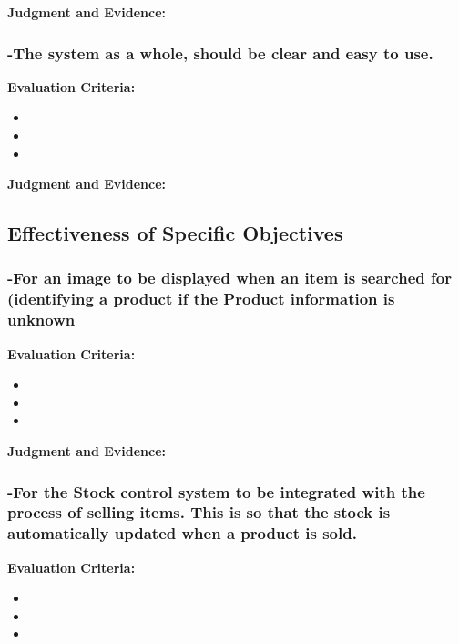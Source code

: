 \textbf{Judgment and Evidence:} \newline







\subsubsection{-The system as a whole, should be clear and easy to use.}
\textbf{Evaluation Criteria:} \newline
\begin{itemize}
\item{}
\item{}
\item{}
\end{itemize}

\textbf{Judgment and Evidence:} \newline









\subsection{Effectiveness of Specific Objectives}













\subsubsection{-For an image to be displayed when an item is searched for (identifying a product if the Product information is unknown}
\textbf{Evaluation Criteria:} \newline
\begin{itemize}
\item{}
\item{}
\item{}
\end{itemize}


\textbf{Judgment and Evidence:} \newline








\subsubsection{-For the Stock control system to be integrated with the process of selling items. This is so that the stock is automatically updated when a product is sold.}
\textbf{Evaluation Criteria:} \newline
\begin{itemize}
\item{}
\item{}
\item{}
\end{itemize}


